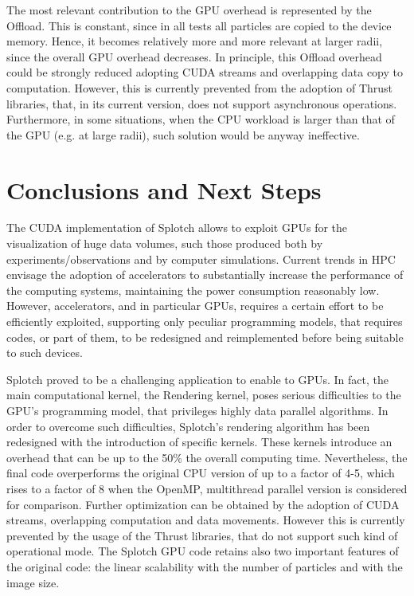 \documentclass[11pt]{article}
\begin{document}
The most relevant contribution to the GPU overhead is represented by the 
Offload. This is constant, since in all tests all particles are copied 
to the device memory. Hence, it becomes relatively more and more relevant at larger
radii, since the overall GPU overhead decreases. In principle, this Offload overhead could
be strongly reduced adopting CUDA streams and overlapping data copy to 
computation. However, this is currently prevented from the adoption of
Thrust libraries, that, in its current version, does not support asynchronous operations. Furthermore,
in some situations, when the CPU workload is larger than that of
the GPU (e.g. at large radii), such solution would be anyway ineffective.  

\section{Conclusions and Next Steps}
\label{sec:conclusions}

The CUDA implementation of Splotch allows to exploit GPUs 
for the visualization of huge data volumes, such those produced both 
by experiments/observations and by computer simulations. Current trends
in HPC envisage the adoption of accelerators to substantially 
increase the performance of the computing systems, maintaining the power
consumption reasonably low. However, accelerators, and in particular 
GPUs, requires a certain effort to be efficiently exploited, 
supporting only peculiar programming models, that requires codes, or part
of them, to be redesigned and reimplemented before being suitable to such devices. 

Splotch proved to be a challenging application to enable to GPUs. 
In fact, the main computational kernel, the Rendering kernel, poses serious difficulties
to the GPU's programming model, that privileges highly data parallel algorithms.
In order to overcome such difficulties, Splotch's rendering algorithm has been
redesigned with the introduction of specific kernels. These kernels 
introduce an overhead that can be up to the 50\% the overall computing
time. Nevertheless, the final code overperforms the original CPU
version of up to a factor of 4-5, which rises to a factor of 8 when the OpenMP,
multithread parallel version is considered for comparison. Further optimization can
be obtained by the adoption of CUDA streams, overlapping computation 
and data movements. However this is currently prevented by the usage of the 
Thrust libraries, that do not support such kind of operational mode. 
The Splotch GPU code retains also two important features of the original
code: the linear scalability with the number of particles and with the 
image size. 
\end{document}
